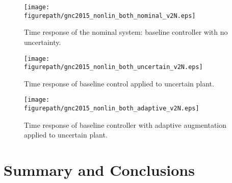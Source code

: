 \documentclass[]{../sty/aiaa-tc}
\newcommand{\figurepath}{../fig}
\begin{document}
  \begin{figure}[H]
    \begin{center}
      \texttt{[image: \\figurepath/gnc2015\_nonlin\_both\_nominal\_v2N.eps]}
      \vspace{-0.1in}
      \caption{Time response of the nominal system: baseline controller with no uncertainty.\label{fig.nominal}}
    \end{center}
  \end{figure}

  \begin{figure}[H]
    \begin{center}
      \texttt{[image: \\figurepath/gnc2015\_nonlin\_both\_uncertain\_v2N.eps]}
      \vspace{-0.1in}
      \caption{Time response of baseline control applied to uncertain plant.\label{fig.baselineuncertain}}
    \end{center}
  \end{figure}

  \begin{figure}[H]
    \begin{center}
      \texttt{[image: \\figurepath/gnc2015\_nonlin\_both\_adaptive\_v2N.eps]}
      \vspace{-0.1in}
      \caption{Time response of baseline controller with adaptive augmentation applied to uncertain plant.\label{fig.adaptive}}
    \end{center}
  \end{figure}

  \section{Summary and Conclusions}
\end{document}
